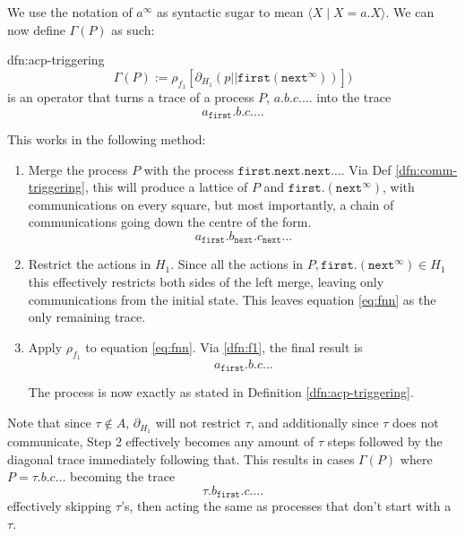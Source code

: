\documentclass[logo,bsc,singlespacing,parskip,online]{infthesis}
\begin{document}
We use the notation of $a^{\infty}$ as syntactic sugar to mean $\langle X \mid X = a.X \rangle$. We can now define $\Gamma(P)$ as such:

\begin{dfn}{dfn:acp-triggering}{}
	\[\Gamma(P) := \rho_{f_{1}}[\partial_{H_{1}}(p | | \mathtt{first}(\mathtt{next}^{\infty}))])\]
	is an operator that turns a trace of a process $P$, $a.b.c.\dots$ into the trace
	\[a_{\mathtt{first}}. b. c. \dots\]
\end{dfn}

This works in the following method:
\vspace{-5pt}
\begin{enumerate}
	\item Merge the process $P$ with the process $\mathtt{first}.\mathtt{next}.\mathtt{next}\dots$. Via Def \ref{dfn:comm-triggering}, this will produce a lattice of $P$ and $\mathtt{first}.(\mathtt{next}^{\infty})$, with communications on every square, but most importantly, a chain of communications going down the centre of the form.
		\begin{equation}\label{eq:fnn}
			a_{\mathtt{first}}. b_{\mathtt{next}} . c_{\mathtt{next}} \dots
		\end{equation}
	\item Restrict the actions in $H_{1}$. Since all the actions in $P, \mathtt{first}.(\mathtt{next}^{\infty}) \in H_{1}$ this effectively restricts both sides of the left merge, leaving only communications from the initial state. This leaves equation \ref{eq:fnn} as the only remaining trace.
	\item Apply $\rho_{f_{1}}$ to equation \ref{eq:fnn}. Via \ref{dfn:f1}, the final result is
		\begin{equation}\label{eq:gamma-result}
			a_{\mathtt{first}}. b . c \dots
		\end{equation}

		The process is now exactly as stated in Definition \ref{dfn:acp-triggering}.
\end{enumerate}
Note that since $\tau\not\in A$, $\partial_{H_{1}}$ will not restrict $\tau$, and additionally since $\tau$ does not communicate, Step 2 effectively becomes any amount of $\tau$ steps followed by the diagonal trace immediately following that. This results in cases $\Gamma(P)$ where $P = \tau.b.c\dots$ becoming the trace
\[\tau.b_{\mathtt{first}}.c.\dots\]
effectively skipping $\tau$'s, then acting the same as processes that don't start with a $\tau$.
\end{document}
